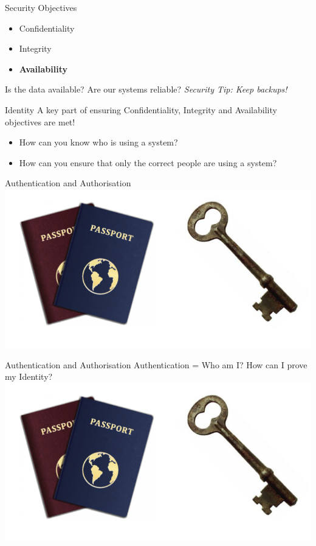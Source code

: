 \documentclass{beamer}
\begin{document}
\begin{frame}{Security Objectives}
	\begin{itemize}
		\item Confidentiality
		\item Integrity
        \item \textbf{Availability}
	\end{itemize}
    Is the data available? Are our systems reliable?
	\linebreak
    \linebreak
    { \color{red} \textit{Security Tip: Keep backups!} }
\end{frame}

\begin{frame}{Identity}
A key part of ensuring Confidentiality, Integrity and Availability objectives are met! 
\begin{itemize}
\item How can you know who is using a system?
\item How can you ensure that only the correct people are using a system?
\end{itemize}
\end{frame}

\begin{frame}{Authentication and Authorisation}
\includegraphics[width=1\linewidth]{authn-authz.png}
\end{frame}

\begin{frame}{Authentication and Authorisation}
Authentication = Who am I? How can I prove my Identity?
\includegraphics[width=1\linewidth]{authn-authz.png}
\end{frame}
\end{document}
